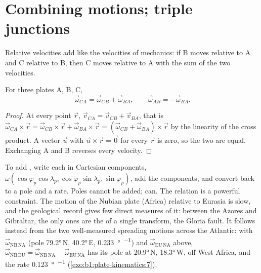 \section{Combining motions; triple junctions}

Relative velocities add like the velocities of mechanics: if B moves relative to
A and C relative to B, then C moves relative to A with the sum of the two
velocities.

\begin{proposition}\label{prop:b1:plate-kinematics:addition}
For three plates A, B, C,
\[
  \vec\omega_{CA} = \vec\omega_{CB} + \vec\omega_{BA}, \qquad
  \vec\omega_{AB} = -\vec\omega_{BA}.
\]
\end{proposition}

\begin{proof}
At every point $\vec r$, $\vec v_{CA} = \vec v_{CB} + \vec v_{BA}$, that is
$\vec\omega_{CA}\times\vec r = \vec\omega_{CB}\times\vec r +
\vec\omega_{BA}\times\vec r = (\vec\omega_{CB} + \vec\omega_{BA})\times\vec r$
by the linearity of the cross product. A vector $\vec u$ with
$\vec u\times\vec r = \vec 0$ for every $\vec r$ is zero, so the two  are equal. Exchanging A and B reverses every velocity.
\end{proof}

To add , write each in Cartesian components, $\omega(\cos\varphi_p
\cos\lambda_p, \cos\varphi_p\sin\lambda_p, \sin\varphi_p)$, add the components,
and convert back to a pole and a rate. Poles cannot be added; 
can. The relation is a powerful constraint. The motion of the Nubian plate
(Africa) relative to Eurasia is slow, and the geological record gives few
direct measures of it: between the Azores and Gibraltar, the only ones are the
 of a single transform, the Gloria fault. It follows instead from the
two well-measured spreading motions across the Atlantic: with $\vec\omega_{\mathrm{NB\,NA}}$ (pole
\ang{79.2}\,N, \ang{40.2}\,E, \qty{0.233}{\degree\per\Myr}) and
$\vec\omega_{\mathrm{EU\,NA}}$ above, $\vec\omega_{\mathrm{NB\,EU}} =
\vec\omega_{\mathrm{NB\,NA}} - \vec\omega_{\mathrm{EU\,NA}}$ has its pole at
\ang{20.9}\,N, \ang{18.3}\,W, off West Africa, and the rate
\qty{0.123}{\degree\per\Myr} (\cref{exo:b1:plate-kinematics:7}).

